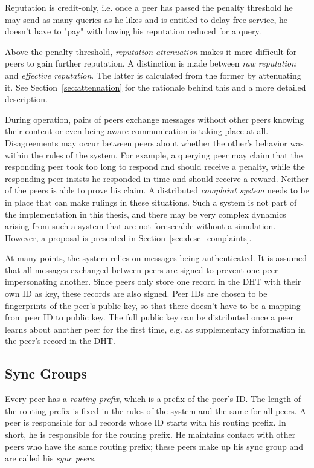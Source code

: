 Reputation is credit-only, i.e. once a peer has passed the penalty threshold he
may send as many queries as he likes and is entitled to delay-free service, he
doesn't have to "pay" with having his reputation reduced for a query.

Above the penalty threshold, \emph{reputation attenuation} makes it more
difficult for peers to gain further reputation. A distinction is made between
\emph{raw reputation} and \emph{effective reputation}. The latter is calculated
from the former by attenuating it. See Section~\ref{sec:attenuation} for the
rationale behind this and a more detailed description.

During operation, pairs of peers exchange messages without other peers knowing
their content or even being aware communication is taking place at all.
Disagreements may occur between peers about whether the other's behavior was
within the rules of the system. For example, a querying peer may claim that the
responding peer took too long to respond and should receive a penalty, while the
responding peer insists he responded in time and should receive a reward.
Neither of the peers is able to prove his claim. A distributed \emph{complaint
system} needs to be in place that can make rulings in these situations. Such a
system is not part of the implementation in this thesis, and there may be very
complex dynamics arising from such a system that are not foreseeable without a
simulation. However, a proposal is presented in
Section~\ref{sec:desc_complaints}.

At many points, the system relies on messages being authenticated. It is assumed
that all messages exchanged between peers are signed to prevent one peer
impersonating another. Since peers only store one record in the \ac{DHT} with
their own ID as key, these records are also signed. Peer IDs are chosen to be
fingerprints of the peer's public key, so that there doesn't have to be a
mapping from peer ID to public key. The full public key can be distributed once
a peer learns about another peer for the first time, e.g. as supplementary
information in the peer's record in the DHT.

\subsection{Sync Groups}
\label{sec:desc_sync_groups}
Every peer has a \emph{routing prefix}, which is a prefix of the peer's ID. The
length of the routing prefix is fixed in the rules of the system and the same
for all peers. A peer is responsible for all records whose ID starts with his
routing prefix. In short, he is responsible for the routing prefix. He maintains
contact with other peers who have the same routing prefix; these peers make up
his sync group and are called his \emph{sync peers}.

